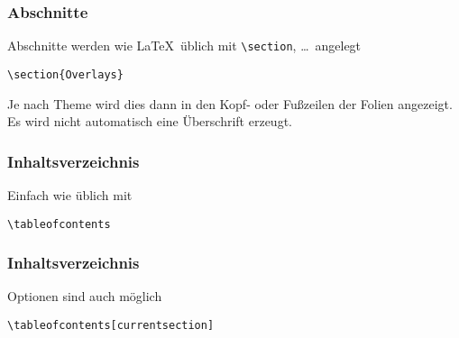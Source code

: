 \begin{slide}
  \frametitle{Abschnitte}

  \onslide<+->

  Abschnitte werden wie \LaTeX\ üblich mit \lstinline{\section}, \dots\ angelegt

\begin{lstlisting}
\section{Overlays}
\end{lstlisting}

  \onslide<+->

  Je nach Theme wird dies dann in den Kopf- oder Fußzeilen der Folien angezeigt. Es wird nicht automatisch eine Überschrift erzeugt.
\end{slide}

\begin{slide}
  \frametitle{Inhaltsverzeichnis}


  Einfach wie üblich mit
\begin{lstlisting}
\tableofcontents
\end{lstlisting}


\end{slide}

\begin{slide}
  \frametitle{Inhaltsverzeichnis}


  Optionen sind auch möglich
\begin{lstlisting}
\tableofcontents[currentsection]
\end{lstlisting}


\end{slide}




